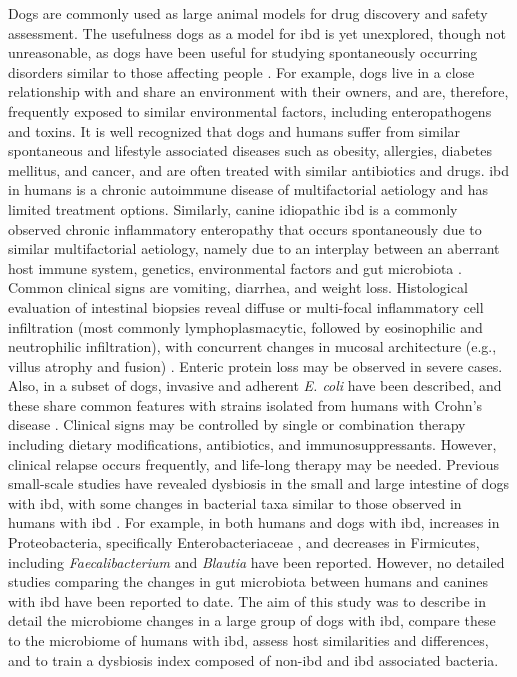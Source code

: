 Dogs are commonly used as large animal models for drug discovery and safety assessment. The usefulness dogs as a model for \gls{ibd} is yet unexplored, though not unreasonable, as dogs have been useful for studying spontaneously occurring disorders similar to those affecting people \cite{RN144}. For example, dogs live in a close relationship with and share an environment with their owners, and are, therefore, frequently exposed to similar environmental factors, including enteropathogens and toxins. It is well recognized that dogs and humans suffer from similar spontaneous and lifestyle associated diseases such as obesity, allergies, diabetes mellitus, and cancer, and are often treated with similar antibiotics and drugs. \gls{ibd} in humans is a chronic autoimmune disease of multifactorial aetiology and has limited treatment options. Similarly, canine idiopathic \gls{ibd} is a commonly observed chronic inflammatory enteropathy that occurs spontaneously due to similar multifactorial aetiology, namely due to an interplay between an aberrant host immune system, genetics, environmental factors and gut microbiota \cite{RN17324}. Common clinical signs are vomiting, diarrhea, and weight loss. Histological evaluation of intestinal biopsies reveal diffuse or multi-focal inflammatory cell infiltration (most commonly lymphoplasmacytic, followed by eosinophilic and neutrophilic infiltration), with concurrent changes in mucosal architecture (e.g., villus atrophy and fusion) \cite{RN174}. Enteric protein loss may be observed in severe cases. Also, in a subset of dogs, invasive and adherent\textit{ E. coli} have been described, and these share common features with strains isolated from humans with Crohn's disease \cite{RN146}.  Clinical signs may be controlled by single or combination therapy including dietary modifications, antibiotics, and immunosuppressants. However, clinical relapse occurs frequently, and life-long therapy may be needed. Previous small-scale studies have revealed dysbiosis in the small and large intestine of dogs with \gls{ibd}, with some changes in bacterial taxa similar to those observed in humans with \gls{ibd} \cite{RN147}. For example, in both humans and dogs with \gls{ibd}, increases in Proteobacteria, specifically Enterobacteriaceae \cite{RN17268}, and decreases in Firmicutes, including \textit{Faecalibacterium} and \textit{Blautia} \cite{RN17138} have been reported. However, no detailed studies comparing the changes in gut microbiota between humans and canines with \gls{ibd} have been reported to date. The aim of this study was to describe in detail the microbiome changes in a large group of dogs with \gls{ibd}, compare these to the microbiome of humans with \gls{ibd}, assess host similarities and differences, and to train a dysbiosis index composed of non-\gls{ibd} and \gls{ibd} associated bacteria.  

